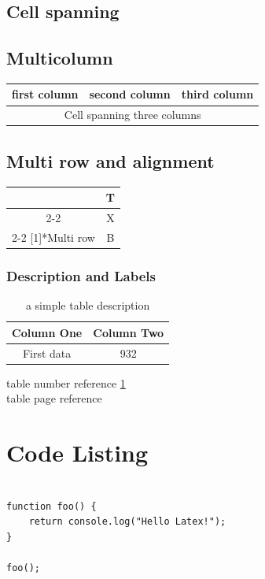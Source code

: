 \documentclass[12pt]{article}
\begin{document}
\subsection{Cell spanning}

\subsection{Multicolumn}
\begin{tabular}{|l|l|l|}
\hline
first column & second column & third column \\
\hline
\multicolumn{3}{|c|}{Cell spanning three columns} \\
\hline
\end{tabular}

\subsection{Multi row and alignment}

\begin{tabular}{|c|c|}
\hline
& T \\
\cline{2-2}
& X \\
\cline{2-2}
\multirow[c]{-3}[1]{*}{Multi row} & B \bigstrut \\
\hline
\end{tabular}



\subsubsection{Description and Labels}
\begin{table}[H]
\centering
\begin{tabular}{|c|c|}
\hline
\bfseries Column One & \bfseries Column Two\\
\hline
First data & 932\\ \hline
\end{tabular}
\caption{a simple table description}
\label{table:simple}
\end{table}

table number reference \ref{table:simple} \\
table page reference \pageref{table:simple}

\section{Code Listing}
\begin{verbatim}

function foo() {
    return console.log("Hello Latex!");
}

foo();

\end{verbatim}
\end{document}
